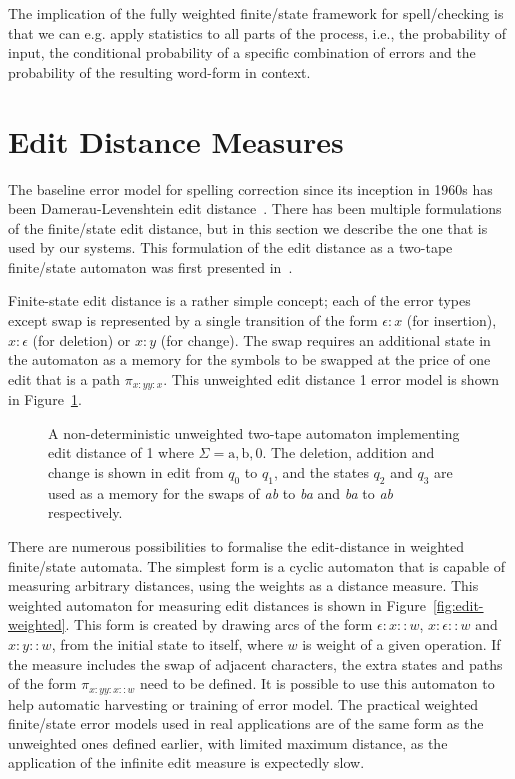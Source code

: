 \documentclass[officiallayout]{unihelcompling}
\begin{document}
The implication of the fully weighted finite\-/state framework for
spell\-/checking is that we can e.g. apply statistics to all parts of the
process, i.e., the probability of input, the conditional probability of a
specific combination of errors and the probability of the resulting word-form
in context. 

\section{Edit Distance Measures}
\label{sec:edit-distance}

The baseline error model for spelling correction since its inception in 1960s
has been Damerau-Levenshtein edit
distance~\citep{damerau1964technique,levenshtein1966binary}. There has been
multiple formulations of the finite\-/state edit distance, but in this section
we describe the one that is used by our systems. This formulation of the edit
distance as a two-tape finite\-/state automaton was first presented
in~\citet{schulz2002fast}.

Finite-state edit distance is a rather simple concept; each of the error types
except swap is represented by a single transition of the form $\epsilon:x$ (for
insertion), $x:\epsilon$ (for deletion) or $x:y$ (for change). The swap
requires an additional state in the automaton as a memory for the symbols to be
swapped at the price of one edit that is a path $\pi_{x:y y:x}$. This
unweighted edit distance 1 error model is shown in Figure~\ref{fig:edit1-ab}.

\begin{figure}
    \caption{A non-deterministic unweighted two-tape automaton implementing
        edit distance of 1 where $\Sigma = {\mathrm{a}, \mathrm{b}, 0}$.
        The deletion, addition and change is shown in
        edit from $q_0$ to $q_1$, and the states $q_2$ and $q_3$ are used as a
        memory for the swaps of \emph{ab} to \emph{ba} and \emph{ba} to
        \emph{ab} respectively.  \label{fig:edit1-ab}}
\end{figure}

There are numerous possibilities to formalise the edit-distance in weighted
finite\-/state automata. The simplest form is a cyclic automaton that is
capable of measuring arbitrary distances, using the weights as a distance
measure. This weighted automaton for measuring edit distances is shown in
Figure~\ref{fig:edit-weighted}. This form is created by drawing arcs of the
form $\epsilon:x::w$, $x:\epsilon::w$ and $x:y::w$, from the initial state to
itself, where $w$ is weight of a given operation. If the measure includes the
swap of adjacent characters, the extra states and paths of the form $\pi_{x:y
y:x::w}$ need to be defined. It is possible to use this automaton to help
automatic harvesting or training of error model. The practical weighted
finite\-/state error models used in real applications are of the same form as
the unweighted ones defined earlier, with limited maximum distance, as the
application of the infinite edit measure is expectedly slow.
\end{document}
